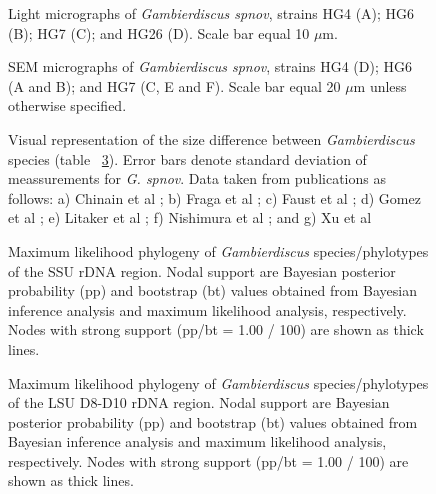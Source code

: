 \documentclass[12pt]{article}
\begin{document}
\FloatBarrier 
\begin{figure} 
\caption{Light micrographs of \emph{Gambierdiscus spnov}, strains HG4 (A); HG6 (B); HG7 (C); and HG26 (D). Scale bar equal 10 $\mu$m.​} 
\label{fig:PetLM}
\end{figure} 

\FloatBarrier 
\begin{figure} 
\caption{SEM micrographs of \emph{Gambierdiscus spnov}, strains HG4 (D); HG6 (A and B); and HG7 (C, E and F). Scale bar equal 20 $\mu$m unless otherwise specified.} 
\label{fig:PetSEM}
\end{figure} 

\FloatBarrier 
\begin{figure} 
\caption{Visual representation of the size difference between \emph{Gambierdiscus} species (table ~\ref{fig:SizeGraph}). Error bars denote standard deviation of meassurements for \emph{G. spnov}. Data taken from publications as follows: a) Chinain et al \citep{chinain1999morphology}; b) Fraga et al \citep{fraga2014genus}; c) Faust et al \citep{faust1995observation}; d) Gomez et al \citep{gomez2015fukuyoa}; e) Litaker et al \citep{litaker2009taxonomy}; f) Nishimura et al \citep{nishimura2014morphology}; and g) Xu et al \citep{xu2014distribution}} 
\label{fig:SizeGraph}
\end{figure} 


\FloatBarrier 
\begin{figure} 
\caption{Maximum likelihood phylogeny of \textit{Gambierdiscus} species/phylotypes of the SSU rDNA region. Nodal support are Bayesian posterior probability (pp) and bootstrap (bt) values obtained from Bayesian inference analysis and maximum likelihood analysis, respectively. Nodes with strong support (pp/bt = 1.00 / 100) are shown as thick lines.}
\label{fig:HGSSU} 
\end{figure} 
\FloatBarrier 

\begin{figure} 
\caption{Maximum likelihood phylogeny of \textit{Gambierdiscus} species/phylotypes of the LSU D8-D10 rDNA region. Nodal support are Bayesian posterior probability (pp) and bootstrap (bt) values obtained from Bayesian inference analysis and maximum likelihood analysis, respectively. Nodes with strong support (pp/bt = 1.00 / 100) are shown as thick lines.} 
\label{fig:HGD8D10}
\end{figure} 
\end{document}
